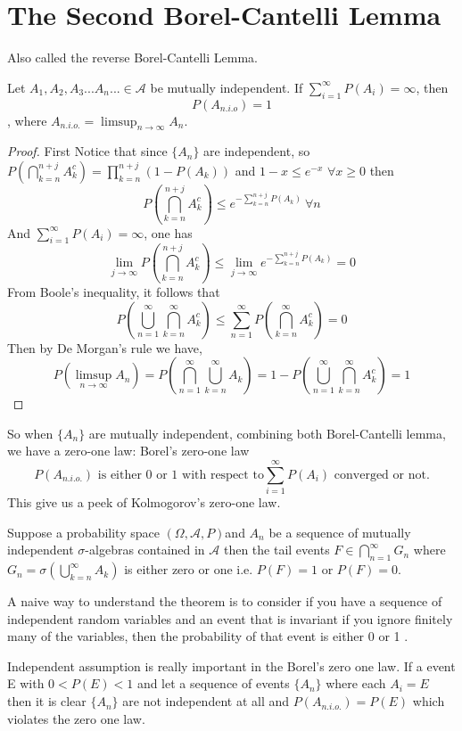 \documentclass[Probability_Theory.tex]{subfiles}
\begin{document}
\section{The Second Borel-Cantelli Lemma}
Also called the reverse Borel-Cantelli Lemma.
\begin{theorem}
Let $A_1,A_2,A_3...A_n...\in \mathcal{A}$ be mutually independent. If $\sum_{i=1}^{\infty}P(A_i)=\infty$, then	$$P(A_{n.i.o}) = 1$$
	, where $A_{n.i.o.} = \limsup_{n\rightarrow\infty}A_n.$
\end{theorem}
\begin{proof}
First Notice that since $\{A_n\}$ are independent, so $P(\bigcap_{k=n}^{n+j}A_k^c)=\prod_{k=n}^{n+j}(1-P(A_k))$ and $1-x\leq e^{-x}$ $\forall x\geq 0$ then $$P(\bigcap_{k=n}^{n+j}A_k^c)\leq e^{-\sum_{k=n}^{n+j}P(A_k)} \ \forall n$$
And $\sum_{i=1}^{\infty}P(A_i)=\infty$, one has 
$$\lim_{j\rightarrow\infty}P(\bigcap_{k=n}^{n+j}A_k^c)\leq \lim_{j\rightarrow\infty}e^{-\sum_{k=n}^{n+j}P(A_k)}=0$$ From Boole's inequality, it follows that $$P(\bigcup_{n=1}^\infty\bigcap_{k=n}^\infty A_k^c)\leq \sum_{n=1}^\infty P(\bigcap_{k=n}^\infty A_k^c)=0$$Then by De Morgan's rule we have,
$$P(\limsup_{n\rightarrow\infty}A_n)=P(\bigcap_{n=1}^\infty\bigcup_{k=n}^\infty A_k)=1-P(\bigcup_{n=1}^\infty\bigcap_{k=n}^\infty A_k^c)=1$$
\end{proof}
So when $\{A_n\}$ are mutually independent, combining both Borel-Cantelli lemma, we have a zero-one law: Borel's zero-one law
$$P(A_{n.i.o.})\text{ is either 0 or 1 with respect to} \sum_{i=1}^{\infty}P(A_i) \text{ converged or not}. 
$$
This give us a peek of Kolmogorov's zero-one law.
\begin{theorem}
Suppose a probability space $(\Omega,\mathcal{A},P)$and $A_n$ be a sequence of mutually independent $\sigma$-algebras contained in $\mathcal{A}$  then the tail events $F\in \bigcap_{n=1}^{\infty}G_n$ where $G_n=\sigma(\bigcup_{k=n}^\infty A_k)$ is either zero or one i.e. $P(F)=1$ or $P(F)=0$.
\end{theorem}
\begin{remark}
A naive way to understand the theorem is to consider if you have a sequence of independent random variables and an event that is invariant if you ignore finitely many of the variables, then the probability of that event is either 0 or 1 .
\end{remark}
\begin{remark}
Independent assumption is really important in the Borel's zero one law. If a event E with $0<P(E)<1$ and let a sequence of events $\{A_n\}$ where each $A_i=E$ then it is clear  $\{A_n\}$ are not independent at all and $P(A_{n.i.o.})=P(E)$ which violates the zero one law.
\end{remark}
\end{document}
